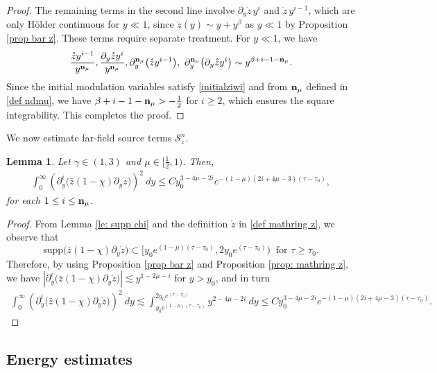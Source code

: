 \documentclass{article}
\newcommand{\ga}{\gamma}
\newcommand{\pa}{\partial}
\def\beqa{\begin{equation}\begin{aligned}}
\def\eeqa{\end{aligned}\end{equation}}
\def\ndmu{{\bf{n}_{\mu}}}
\numberwithin{equation}{section}
\newtheorem{lemma}[theorem]{Lemma}
\begin{document}
\begin{proof}
 The remaining terms in the second line involve $\pa_y \mathring z\, y^{i}$ and $\mathring z\, y^{i-1}$, which are only H\"{o}lder continuous for $y\ll 1$, since $\mathring z(y)\sim y+y^\beta$ as $y\ll 1$ by Proposition \ref{prop bar z}. These terms require separate treatment. 
 For $y\ll 1$, we have
    \begin{align*}
    \frac{\mathring z y^{i-1}}{y^\ndmu},  \frac{\pa_y\mathring z y^{i}}{y^\ndmu},   \pa_y^{\ndmu} \big(\mathring z y^{i-1} \big),\  \pa_y^{\ndmu} \big(\pa_y \mathring z y^{i}\big) \sim y^{\beta+i-1-\ndmu}.
   \end{align*}
 Since the initial modulation variables satisfy \eqref{initialziwi} and from $\ndmu$ defined in \eqref{def ndmu}, we have $\beta+i-1-\ndmu >-\frac12$ for $i\geq 2$, which ensures the square integrability.  This completes the proof.
\end{proof}



We now estimate far-field source terms $\mathcal S^n_z$. 

\begin{lemma}\label{estimate of Schi}
	Let $\ga\in(1,3)$ and $\mu\in [\frac12,1)$.
    Then,
	\beqa
		 \int_0^\infty (\pa_y^i\big(  \bar z (1-\chi) \pa_y \mathring z\big))^2  \ dy  \leq C y_0^{3-4\mu-2i} e ^{-(1-\mu)(2i +4\mu -3) (\tau-\tau_0)}, 
	\eeqa
	for each $1\le i\le \ndmu$. 
\end{lemma}
\begin{proof}
	From Lemma \ref{le: supp chi} and the definition $\mathring z$ in \eqref{def mathring z}, we observe that
	\[
		\text{supp}\big(\bar z (1-\chi) \pa_y \mathring z\big) \subset [y_0e^{(1-\mu)(\tau-\tau_0)}, 2y_0e^{(\tau-\tau_0)})\ \text{ for }\tau\geq \tau_0.
	\]
	Therefore, by using Proposition \ref{prop bar z} and Proposition  \ref{prop: mathring z}, we have $|\pa_y^i\big(  \bar z (1-\chi) \pa_y \mathring z\big)| \lesssim y^{1-2 \mu - i }$ for $y>y_0$, and in turn %
	\begin{align*}
		 \int_0^\infty (\pa_y^i\big(  \bar z (1-\chi) \pa_y \mathring z\big))^2  \ dy
         \lesssim \int_{y_0e^{(1-\mu)(\tau-\tau_0)}}^{2y_0e^{(\tau-\tau_0)}} y^{2-4\mu-2i } \ dy \leq C y_0^{3-4\mu-2i} e ^{-(1-\mu)(2i +4\mu -3) (\tau-\tau_0)}.
	\end{align*}
\end{proof}		



\subsection{Energy estimates}
\end{document}
